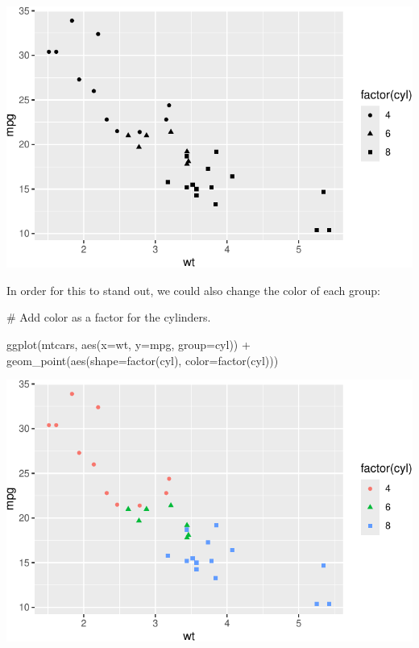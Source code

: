 \documentclass[
  letterpaper,
  DIV=11,
  numbers=noendperiod]{scrreprt}
\newenvironment{Shaded}{\begin{snugshade}}{\end{snugshade}}
\newcommand{\AttributeTok}[1]{\textcolor[rgb]{0.40,0.45,0.13}{#1}}
\newcommand{\CommentTok}[1]{\textcolor[rgb]{0.37,0.37,0.37}{#1}}
\newcommand{\FunctionTok}[1]{\textcolor[rgb]{0.28,0.35,0.67}{#1}}
\newcommand{\NormalTok}[1]{\textcolor[rgb]{0.00,0.23,0.31}{#1}}
\newcommand{\SpecialCharTok}[1]{\textcolor[rgb]{0.37,0.37,0.37}{#1}}
\begin{document}
\includegraphics{Advanced_Scatterplot_Techniques_files/figure-pdf/unnamed-chunk-9-1.pdf}

In order for this to stand out, we could also change the color of each
group:

\begin{Shaded}
\begin{Highlighting}[]
\CommentTok{\# Add color as a factor for the cylinders.}

\FunctionTok{ggplot}\NormalTok{(mtcars, }\FunctionTok{aes}\NormalTok{(}\AttributeTok{x=}\NormalTok{wt, }\AttributeTok{y=}\NormalTok{mpg, }\AttributeTok{group=}\NormalTok{cyl)) }\SpecialCharTok{+}
  \FunctionTok{geom\_point}\NormalTok{(}\FunctionTok{aes}\NormalTok{(}\AttributeTok{shape=}\FunctionTok{factor}\NormalTok{(cyl), }\AttributeTok{color=}\FunctionTok{factor}\NormalTok{(cyl)))}
\end{Highlighting}
\end{Shaded}

\includegraphics{Advanced_Scatterplot_Techniques_files/figure-pdf/unnamed-chunk-10-1.pdf}
\end{document}
